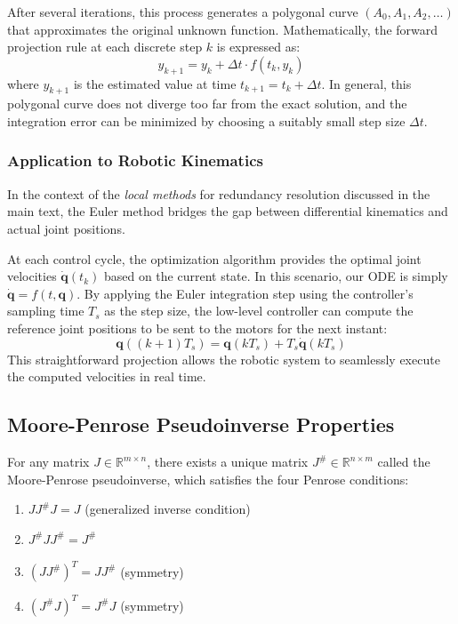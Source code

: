 After several iterations, this process generates a polygonal curve $(A_0, A_1, A_2, \dots)$ that approximates the original unknown function. Mathematically, the forward projection rule at each discrete step $k$ is expressed as:
\begin{equation}
    y_{k+1} = y_k + \Delta t \cdot f(t_k, y_k)
\end{equation}
where $y_{k+1}$ is the estimated value at time $t_{k+1} = t_k + \Delta t$. In general, this polygonal curve does not diverge too far from the exact solution, and the integration error can be minimized by choosing a suitably small step size $\Delta t$.

\subsubsection{Application to Robotic Kinematics}

In the context of the \textit{local methods} for redundancy resolution discussed in the main text, the Euler method bridges the gap between differential kinematics and actual joint positions. 

At each control cycle, the optimization algorithm provides the optimal joint velocities $\dot{\mathbf{q}}(t_k)$ based on the current state. In this scenario, our ODE is simply $\dot{\mathbf{q}} = f(t, \mathbf{q})$. By applying the Euler integration step using the controller's sampling time $T_s$ as the step size, the low-level controller can compute the reference joint positions to be sent to the motors for the next instant:
\begin{equation}
    \mathbf{q}((k+1)T_s) = \mathbf{q}(kT_s) + T_s \dot{\mathbf{q}}(kT_s)
\end{equation}
This straightforward projection allows the robotic system to seamlessly execute the computed velocities in real time.

\subsection{Moore-Penrose Pseudoinverse Properties}
\label{sec:Pseudoinverse}

For any matrix $J \in \mathbb{R}^{m \times n}$, there exists a unique matrix $J^\# \in \mathbb{R}^{n \times m}$ called the Moore-Penrose pseudoinverse, which satisfies the four Penrose conditions:
\begin{enumerate}
    \item $J J^\# J = J$ \quad (generalized inverse condition)
    \item $J^\# J J^\# = J^\#$
    \item $(J J^\#)^T = J J^\#$ \quad (symmetry)
    \item $(J^\# J)^T = J^\# J$ \quad (symmetry)
\end{enumerate}

